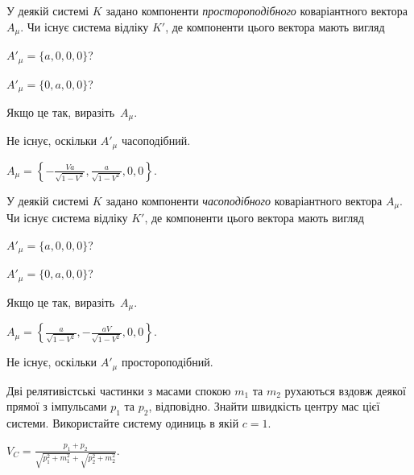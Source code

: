 \begin{problem}
У деякій системі $K$ задано компоненти \emph{простороподібного} коваріантного вектора $A_{\mu}$. Чи існує система відліку $K'$, де компоненти цього вектора мають вигляд
\begin{enumerate*}[label=\alph*)]
	\item $A'_{\mu} = \{a,0,0,0\}$?
	\item $A'_{\mu} = \{0,a,0,0\}$?
\end{enumerate*}
Якщо це так, виразіть~$A_{\mu}$.
\begin{solution}
	\begin{enumerate*}[label=\alph*)]
		\item Не існує, оскільки $A'_{\mu}$ часоподібний.
		\item $A_{\mu} = \left\lbrace -\frac{Va}{\sqrt{1-V^2}},\frac{a}{\sqrt{1-V^2}},0,0 \right\rbrace$.
	\end{enumerate*}
\end{solution}
\end{problem}

\begin{problem}
У деякій системі $K$ задано компоненти \emph{часоподібного} коваріантного вектора $A_{\mu}$. Чи існує система відліку $K'$, де компоненти цього вектора мають вигляд
\begin{enumerate*}[label=\alph*)]
	\item $A'_{\mu} = \{a,0,0,0\}$?
	\item $A'_{\mu} = \{0,a,0,0\}$?
\end{enumerate*}
Якщо це так, виразіть~$A_{\mu}$.
\begin{solution}
	\begin{enumerate*}[label=\alph*)]
		\item $A_{\mu} = \left\lbrace \frac{a}{\sqrt{1-V^2}},-\frac{aV}{\sqrt{1-V^2}},0,0 \right\rbrace$.
		\item Не існує, оскільки $A'_{\mu}$ простороподібний.
	\end{enumerate*}
\end{solution}
\end{problem}

\begin{problem}
Дві релятивістські частинки з масами спокою  $m_1$ та $m_2$ рухаються вздовж деякої прямої з імпульсами $p_1$ та $p_2$, відповідно. Знайти швидкість центру мас цієї системи. Використайте систему одиниць в якій $c = 1$.
\begin{solution}
	$V_C = \frac{p_1 + p_2}{\sqrt{p_1^2 + m_1^2} + \sqrt{p_2^2 + m_2^2}}$.
\end{solution}
\end{problem}

